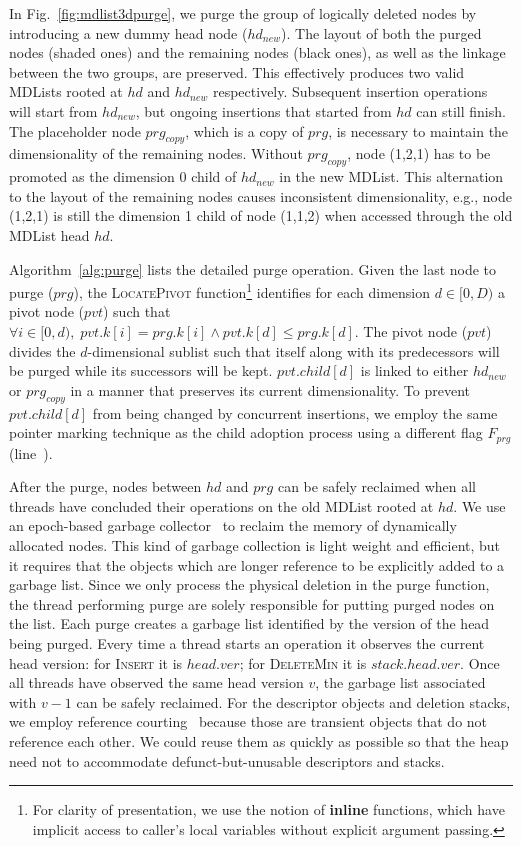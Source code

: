 \documentclass[10pt,journal,letter,compsoc]{IEEEtran}
\begin{document}
In Fig.~\ref{fig:mdlist3dpurge}, we purge the group of logically deleted nodes by introducing a new dummy head node ($hd_{new}$).
The layout of both the purged nodes (shaded ones) and the remaining nodes (black ones), as well as the linkage between the two groups, are preserved.
This effectively produces two valid MDLists rooted at $hd$ and $hd_{new}$ respectively.
Subsequent insertion operations will start from $hd_{new}$, but ongoing insertions that started from $hd$ can still finish.
The placeholder node $prg_{copy}$, which is a copy of $prg$, is necessary to maintain the dimensionality of the remaining nodes.
Without $prg_{copy}$, node (1,2,1) has to be promoted as the dimension 0 child of $hd_{new}$ in the new MDList.
This alternation to the layout of the remaining nodes causes inconsistent dimensionality, e.g., node (1,2,1) is still the dimension 1 child of node (1,1,2) when accessed through the old MDList head $hd$.

Algorithm~\ref{alg:purge} lists the detailed purge operation.
Given the last node to purge ($prg$), the \textsc{LocatePivot} function\footnote{For clarity of presentation, we use the notion of \textbf{inline} functions, which have implicit access to caller's local variables without explicit argument passing.} identifies for each dimension $d\in[0,D)$ a pivot node ($pvt$) such that $\forall i \in [0,d),\;pvt.k[i]=prg.k[i] \land pvt.k[d] \le prg.k[d]$. 
The pivot node ($pvt$) divides the $d$-dimensional sublist such that itself along with its predecessors will be purged while its successors will be kept.
$pvt.child[d]$ is linked to either $hd_{new}$ or $prg_{copy}$ in a manner that preserves its current dimensionality.
To prevent $pvt.child[d]$ from being changed by concurrent insertions, we employ the same pointer marking technique as the child adoption process using a different flag $F_{prg}$ (line~).

After the purge, nodes between $hd$ and $prg$ can be safely reclaimed when all threads have concluded their operations on the old MDList rooted at $hd$.
We use an epoch-based garbage collector~\cite{pugh1990concurrent,fraser2004practical} to reclaim the memory of dynamically allocated nodes.
This kind of garbage collection is light weight and efficient, but it requires that the objects which are longer reference to be explicitly added to a garbage list.
Since we only process the physical deletion in the purge function, the thread performing purge are solely responsible for putting purged nodes on the list. 
Each purge creates a garbage list identified by the version of the head being purged.
Every time a thread starts an operation it observes the current head version: for \textsc{Insert} it is $head.ver$; for \textsc{DeleteMin} it is $stack.head.ver$.
Once all threads have observed the same head version $v$, the garbage list associated with $v-1$ can be safely reclaimed.
For the descriptor objects and deletion stacks, we employ reference courting~\cite{michael1995correction} because those are transient objects that do not reference each other.
We could reuse them as quickly as possible so that the heap need not to accommodate defunct-but-unusable descriptors and stacks.
\end{document}
